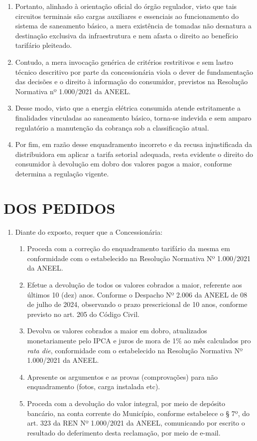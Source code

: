 \begin{enumerate}[resume]
    \item Portanto, alinhado à orientação oficial do órgão regulador, visto que tais circuitos terminais são cargas auxiliares e essenciais ao funcionamento do sistema de saneamento básico, a mera existência de tomadas não desnatura a destinação exclusiva da infraestrutura e nem afasta o direito ao benefício tarifário pleiteado.  

    \item Contudo, a mera invocação genérica de critérios restritivos e sem lastro técnico descritivo por parte da concessionária viola o dever de fundamentação das decisões e o direito à informação do consumidor, previstos na Resolução Normativa nº 1.000/2021 da ANEEL.  

    \item Desse modo, visto que a energia elétrica consumida atende estritamente a finalidades vinculadas ao saneamento básico, torna-se indevida e sem amparo regulatório a manutenção da cobrança sob a classificação atual.  

    \item Por fim, em razão desse enquadramento incorreto e da recusa injustificada da distribuidora em aplicar a tarifa setorial adequada, resta evidente o direito do consumidor à devolução em dobro dos valores pagos a maior, conforme determina a regulação vigente.
\end{enumerate}

\section{DOS PEDIDOS}

\begin{enumerate}[resume]
\item 
Diante do exposto, requer que a Concessionária:

\begin{enumerate}
\item 
Proceda com a correção do enquadramento tarifário da mesma em conformidade com o estabelecido na Resolução Normativa Nº 1.000/2021 da ANEEL.
\item 
Efetue a devolução de todos os valores cobrados a maior, referente aos últimos 10 (dez) anos. Conforme o Despacho Nº 2.006 da ANEEL de 08 de julho de 2024, observando o prazo prescricional de 10 anos, conforme previsto no art. 205 do Código Civil.
\item 
Devolva os valores cobrados a maior em dobro, atualizados monetariamente pelo IPCA e juros de mora de 1\% ao mês calculados pro \textit{rata die}, conformidade com o estabelecido na Resolução Normativa Nº 1.000/2021 da ANEEL.   
\item 
Apresente os argumentos e as provas (comprovações) para não enquadramento (fotos, carga instalada etc).   
\item 
Proceda com a devolução do valor integral, por meio de depósito bancário, na conta corrente do Município, conforme estabelece o § 7º, do art. 323 da REN Nº 1.000/2021 da ANEEL, comunicando por escrito o resultado do deferimento desta reclamação, por meio de e-mail.

\end{enumerate}
\end{enumerate}